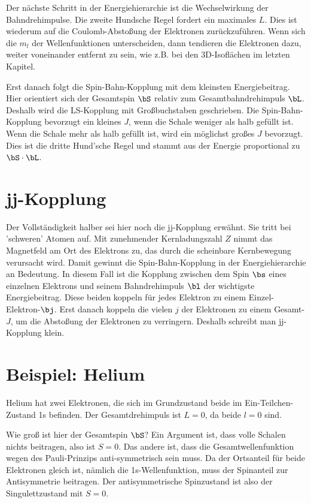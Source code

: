 Der nächste Schritt in der Energiehierarchie ist die Wechselwirkung der Bahndrehimpulse. Die zweite Hundsche Regel fordert ein maximales $L$. Dies ist wiederum auf die Coulomb-Abstoßung der Elektronen zurückzuführen. Wenn sich die $m_l$ der Wellenfunktionen unterscheiden, dann tendieren die Elektronen dazu, weiter voneinander entfernt zu sein, wie z.B. bei den 3D-Isoflächen im letzten Kapitel.

Erst danach folgt die Spin-Bahn-Kopplung mit dem kleinsten Energiebeitrag. Hier orientiert sich der Gesamtspin $\bS$ relativ zum Gesamtbahndrehimpuls $\bL$. Deshalb wird die LS-Kopplung mit Großbuchstaben geschrieben. Die Spin-Bahn-Kopplung bevorzugt ein kleines $J$, wenn die Schale weniger als halb gefüllt ist. Wenn die Schale mehr als halb gefüllt ist, wird ein möglichst großes $J$ bevorzugt. Dies ist die dritte Hund'sche Regel und stammt aus der Energie  proportional zu $\bS \cdot \bL$.

\section{jj-Kopplung}

Der Vollständigkeit halber sei hier noch die jj-Kopplung erwähnt. Sie tritt bei 'schweren' Atomen auf. Mit zunehmender Kernladungszahl $Z$ nimmt das Magnetfeld am Ort des Elektrons zu, das durch die scheinbare Kernbewegung verursacht wird. Damit gewinnt die Spin-Bahn-Kopplung in der Energiehierarchie an Bedeutung. In diesem Fall ist die Kopplung zwischen dem Spin $\bs$ eines einzelnen Elektrons und seinem Bahndrehimpuls $\bl$ der wichtigste Energiebeitrag. Diese beiden koppeln für jedes Elektron zu einem Einzel-Elektron-$\bj$. Erst danach koppeln die vielen $j$ der Elektronen zu einem Gesamt-$J$, um die Abstoßung der Elektronen zu verringern. Deshalb schreibt man jj-Kopplung klein.


\section{Beispiel: Helium}

Helium hat zwei Elektronen, die sich im Grundzustand beide im Ein-Teilchen-Zustand 1s befinden. Der Gesamtdrehimpuls ist $L=0$, da beide $l=0$ sind.

Wie groß ist hier der Gesamtspin $\bS$? Ein Argument ist, dass volle Schalen nichts beitragen, also ist $S=0$. Das andere ist, dass die Gesamtwellenfunktion wegen des Pauli-Prinzips anti-symmetrisch sein muss. Da der Ortsanteil für beide Elektronen gleich ist, nämlich die 1s-Wellenfunktion, muss der Spinanteil zur Antisymmetrie beitragen. Der antisymmetrische Spinzustand ist also der Singulettzustand mit $S=0$.


